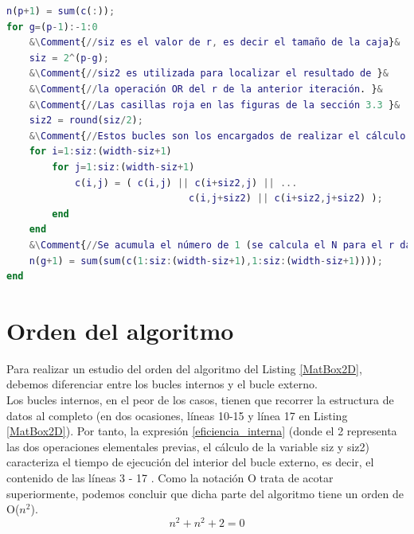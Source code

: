 \begin{lstlisting}[language=Matlab,caption={Código Matlab del método Box counting para matrices bidimensionales. Las variables de entrada del código son la matriz c (matriz binaria que queremos analizar), la lista n (inicialmente vacía, contendrá el número de cajas válidas para cada tamaño de caja) y la variable p. que representa el número de iteraciones necesarias para cubrir la matriz entera, teniendo en cuenta que cada iteración aumenta el tamaño de la caja en una potencia de dos.},label=MatBox2D]
n(p+1) = sum(c(:));
for g=(p-1):-1:0
    &\Comment{//siz es el valor de r, es decir el tamaño de la caja}&
    siz = 2^(p-g);
    &\Comment{//siz2 es utilizada para localizar el resultado de }&
    &\Comment{//la operación OR del r de la anterior iteración. }&
    &\Comment{//Las casillas roja en las figuras de la sección 3.3 }&
    siz2 = round(siz/2);
    &\Comment{//Estos bucles son los encargados de realizar el cálculo del OR}&
    for i=1:siz:(width-siz+1)
        for j=1:siz:(width-siz+1)
            c(i,j) = ( c(i,j) || c(i+siz2,j) || ...
                                c(i,j+siz2) || c(i+siz2,j+siz2) );
        end
    end
    &\Comment{//Se acumula el número de 1 (se calcula el N para el r dado)}&
    n(g+1) = sum(sum(c(1:siz:(width-siz+1),1:siz:(width-siz+1))));
end
\end{lstlisting}

\section{Orden del algoritmo}
Para realizar un estudio del orden del algoritmo del Listing \ref{MatBox2D}, debemos diferenciar entre los bucles internos y el bucle  externo.\\

Los bucles internos, en el peor de los casos, tienen que recorrer la estructura de datos al completo (en dos ocasiones, líneas 10-15 y línea 17 en Listing \ref{MatBox2D}). Por tanto, la expresión \ref{eficiencia_interna} (donde el 2 representa las dos operaciones elementales previas, el cálculo de la variable siz y siz2) caracteriza el tiempo de ejecución del interior del bucle externo, es decir, el contenido de las líneas 3 - 17 . Como la notación O trata de acotar superiormente, podemos concluir que dicha parte del algoritmo tiene un orden de O($n^2$).\\

\begin{equation}
    \label{eficiencia_interna}
    n^2 + n^2 + 2 = 0
\end{equation}

